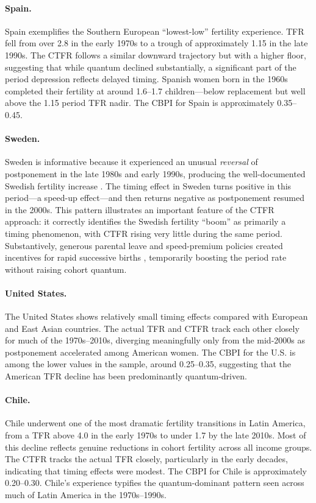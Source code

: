 \documentclass[12pt]{article}
\begin{document}
\paragraph{Spain.}
Spain exemplifies the Southern European ``lowest-low'' fertility
experience.  TFR fell from over 2.8 in the early 1970s to a trough of
approximately 1.15 in the late 1990s.  The CTFR follows a similar
downward trajectory but with a higher floor, suggesting that while
quantum declined substantially, a significant part of the period
depression reflects delayed timing.  Spanish women born in the 1960s
completed their fertility at around 1.6--1.7 children---below
replacement but well above the 1.15 period TFR nadir.  The CBPI for
Spain is approximately 0.35--0.45.

\paragraph{Sweden.}
Sweden is informative because it experienced an unusual \emph{reversal}
of postponement in the late 1980s and early 1990s, producing the
well-documented Swedish fertility increase \citep{HoemBramsen1988}.
The timing effect in Sweden turns positive in this period---a speed-up
effect---and then returns negative as postponement resumed in the
2000s.  This pattern illustrates an important feature of the CTFR
approach: it correctly identifies the Swedish fertility ``boom'' as
primarily a timing phenomenon, with CTFR rising very little during the
same period.  Substantively, generous parental leave and speed-premium
policies created incentives for rapid successive births \citep{Andersson2004},
temporarily boosting the period rate without raising cohort quantum.

\paragraph{United States.}
The United States shows relatively small timing effects compared with
European and East Asian countries.  The actual TFR and CTFR track each
other closely for much of the 1970s--2010s, diverging meaningfully only
from the mid-2000s as postponement accelerated among American women.
The CBPI for the U.S. is among the lower values in the sample, around
0.25--0.35, suggesting that the American TFR decline has been
predominantly quantum-driven.

\paragraph{Chile.}
Chile underwent one of the most dramatic fertility transitions in Latin
America, from a TFR above 4.0 in the early 1970s to under 1.7 by the
late 2010s.  Most of this decline reflects genuine reductions in cohort
fertility across all income groups.  The CTFR tracks the actual TFR
closely, particularly in the early decades, indicating that timing
effects were modest.  The CBPI for Chile is approximately 0.20--0.30.
Chile's experience typifies the quantum-dominant pattern seen across
much of Latin America in the 1970s--1990s.
\end{document}
